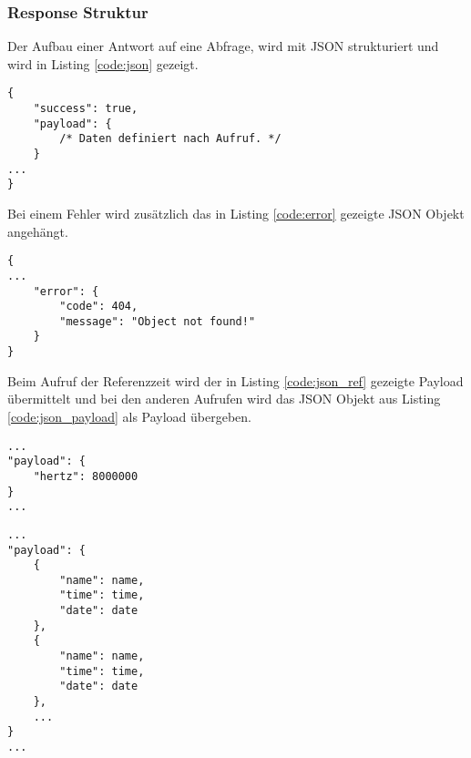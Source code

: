 \clearpage
\subsubsection{Response Struktur}\label{sec:rest_struct}
Der Aufbau einer Antwort auf eine Abfrage, wird mit JSON strukturiert und wird in Listing \ref{code:json} gezeigt.
\begin{lstlisting}[caption="generische Antwortstruktur mit JSON",label={code:json}]
{
    "success": true,
    "payload": {
        /* Daten definiert nach Aufruf. */
    }
...
}
\end{lstlisting}

\noindent Bei einem Fehler wird zusätzlich das in Listing \ref{code:error} gezeigte JSON Objekt angehängt.
\begin{lstlisting}[caption="JSON Objekt bei Fehler",label={code:error}]
{
...
    "error": {
        "code": 404,
        "message": "Object not found!"
    }
}
\end{lstlisting}

\noindent Beim Aufruf der Referenzzeit wird der in Listing \ref{code:json_ref} gezeigte Payload übermittelt und bei den anderen Aufrufen wird das JSON Objekt aus Listing \ref{code:json_payload} als Payload übergeben.
\begin{lstlisting}[caption="Payload für Referenzzeit",label={code:json_ref}]
...
"payload": {
    "hertz": 8000000
}
...
\end{lstlisting}
\begin{lstlisting}[caption="Payload für Datums und Namensabfrage",label={code:json_payload}]
...
"payload": {
    {
        "name": name,
        "time": time,
        "date": date
    },
    {
        "name": name,
        "time": time,
        "date": date
    },
    ...
}
...
\end{lstlisting}